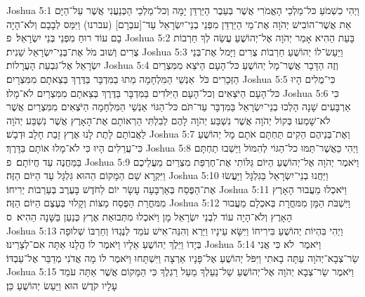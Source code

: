 Joshua 5:1	וַיְהִי כִשְׁמֹעַ כּל־מַלְכֵי הָאֱמֹרִי אֲשֶׁר בְּעֵבֶר הַיַּרְדֵּן יָמָּה וְכל־מַלְכֵי הַכְּנַעֲנִי אֲשֶׁר עַל־הַיָּם אֵת אֲשֶׁר־הוֹבִישׁ יְהֹוָה אֶת־מֵי הַיַּרְדֵּן מִפְּנֵי בְנֵי־יִשְׂרָאֵל עַד־[עבְרָם] (עברנו) וַיִּמַּס לְבָבָם וְלֹא־הָיָה בָם עוֹד רוּחַ מִפְּנֵי בְּנֵי יִשְׂרָאֵל׃ {פ}
Joshua 5:2	בָּעֵת הַהִיא אָמַר יְהֹוָה אֶל־יְהוֹשֻׁעַ עֲשֵׂה לְךָ חַרְבוֹת צֻרִים וְשׁוּב מֹל אֶת־בְּנֵי־יִשְׂרָאֵל שֵׁנִית׃
Joshua 5:3	וַיַּעַשׂ־לוֹ יְהוֹשֻׁעַ חַרְבוֹת צֻרִים וַיָּמל אֶת־בְּנֵי יִשְׂרָאֵל אֶל־גִּבְעַת הָעֲרָלוֹת׃
Joshua 5:4	וְזֶה הַדָּבָר אֲשֶׁר־מָל יְהוֹשֻׁעַ כּל־הָעָם הַיֹּצֵא מִמִּצְרַיִם הַזְּכָרִים כֹּל  אַנְשֵׁי הַמִּלְחָמָה מֵתוּ בַמִּדְבָּר בַּדֶּרֶךְ בְּצֵאתָם מִמִּצְרָיִם׃
Joshua 5:5	כִּי־מֻלִים הָיוּ כּל־הָעָם הַיֹּצְאִים וְכל־הָעָם הַיִּלֹּדִים בַּמִּדְבָּר בַּדֶּרֶךְ בְּצֵאתָם מִמִּצְרַיִם לֹא־מָלוּ׃
Joshua 5:6	כִּי  אַרְבָּעִים שָׁנָה הָלְכוּ בְנֵי־יִשְׂרָאֵל בַּמִּדְבָּר עַד־תֹּם כּל־הַגּוֹי אַנְשֵׁי הַמִּלְחָמָה הַיֹּצְאִים מִמִּצְרַיִם אֲשֶׁר לֹא־שָׁמְעוּ בְּקוֹל יְהֹוָה אֲשֶׁר נִשְׁבַּע יְהֹוָה לָהֶם לְבִלְתִּי הַרְאוֹתָם אֶת־הָאָרֶץ אֲשֶׁר נִשְׁבַּע יְהֹוָה לַאֲבוֹתָם לָתֶת לָנוּ אֶרֶץ זָבַת חָלָב וּדְבָשׁ׃
Joshua 5:7	וְאֶת־בְּנֵיהֶם הֵקִים תַּחְתָּם אֹתָם מָל יְהוֹשֻׁעַ כִּי־עֲרֵלִים הָיוּ כִּי לֹא־מָלוּ אוֹתָם בַּדָּרֶךְ׃
Joshua 5:8	וַיְהִי כַּאֲשֶׁר־תַּמּוּ כל־הַגּוֹי לְהִמּוֹל וַיֵּשְׁבוּ תַחְתָּם בַּמַּחֲנֶה עַד חֲיוֹתָם׃ {פ}
Joshua 5:9	וַיֹּאמֶר יְהֹוָה אֶל־יְהוֹשֻׁעַ הַיּוֹם גַּלּוֹתִי אֶת־חֶרְפַּת מִצְרַיִם מֵעֲלֵיכֶם וַיִּקְרָא שֵׁם הַמָּקוֹם הַהוּא גִּלְגָּל עַד הַיּוֹם הַזֶּה׃
Joshua 5:10	וַיַּחֲנוּ בְנֵי־יִשְׂרָאֵל בַּגִּלְגָּל וַיַּעֲשׂוּ אֶת־הַפֶּסַח בְּאַרְבָּעָה עָשָׂר יוֹם לַחֹדֶשׁ בָּעֶרֶב בְּעַרְבוֹת יְרִיחוֹ׃
Joshua 5:11	וַיֹּאכְלוּ מֵעֲבוּר הָאָרֶץ מִמּחֳרַת הַפֶּסַח מַצּוֹת וְקָלוּי בְּעֶצֶם הַיּוֹם הַזֶּה׃
Joshua 5:12	וַיִּשְׁבֹּת הַמָּן מִמּחֳרָת בְּאכְלָם מֵעֲבוּר הָאָרֶץ וְלֹא־הָיָה עוֹד לִבְנֵי יִשְׂרָאֵל מָן וַיֹּאכְלוּ מִתְּבוּאַת אֶרֶץ כְּנַעַן בַּשָּׁנָה הַהִיא׃ {ס}        
Joshua 5:13	וַיְהִי בִּהְיוֹת יְהוֹשֻׁעַ בִּירִיחוֹ וַיִּשָּׂא עֵינָיו וַיַּרְא וְהִנֵּה־אִישׁ עֹמֵד לְנֶגְדּוֹ וְחַרְבּוֹ שְׁלוּפָה בְּיָדוֹ וַיֵּלֶךְ יְהוֹשֻׁעַ אֵלָיו וַיֹּאמֶר לוֹ הֲלָנוּ אַתָּה אִם־לְצָרֵינוּ׃
Joshua 5:14	וַיֹּאמֶר  לֹא כִּי אֲנִי שַׂר־צְבָא־יְהֹוָה עַתָּה בָאתִי וַיִּפֹּל יְהוֹשֻׁעַ אֶל־פָּנָיו אַרְצָה וַיִּשְׁתָּחוּ וַיֹּאמֶר לוֹ מָה אֲדֹנִי מְדַבֵּר אֶל־עַבְדּוֹ׃
Joshua 5:15	וַיֹּאמֶר שַׂר־צְבָא יְהֹוָה אֶל־יְהוֹשֻׁעַ שַׁל־נַעַלְךָ מֵעַל רַגְלֶךָ כִּי הַמָּקוֹם אֲשֶׁר אַתָּה עֹמֵד עָלָיו קֹדֶשׁ הוּא וַיַּעַשׂ יְהוֹשֻׁעַ כֵּן׃
